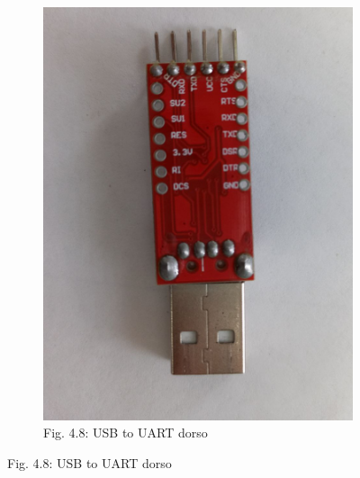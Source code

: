 \documentclass[12pt]{article}
\begin{document}
\begin{figure}[ht]
\begin{subfigure}[b]{0.45\linewidth}
    \includegraphics[width=\linewidth]{images/USB-UART-2.jpg}
    \caption{Fig. 4.8: USB to UART dorso}
  \end{subfigure}
\end{figure}
\end{document}
